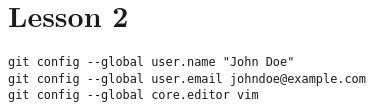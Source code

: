
\section{Lesson 2}

\begin{verbatim}
git config --global user.name "John Doe"
git config --global user.email johndoe@example.com
git config --global core.editor vim
\end{verbatim}
